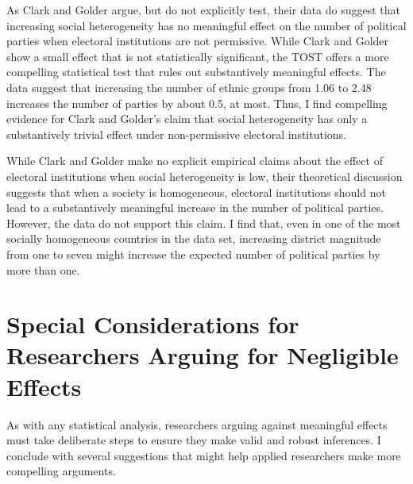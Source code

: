 \documentclass[12pt]{article}
\begin{document}
As Clark and Golder argue, but do not explicitly test, their data do suggest that increasing social heterogeneity has no meaningful effect on the number of political parties when electoral institutions are not permissive. While Clark and Golder show a small effect that is not statistically significant, the TOST offers a more compelling statistical test that rules out substantively meaningful effects. The data suggest that increasing the number of ethnic groups from 1.06 to 2.48 increases the number of parties  by about 0.5, at most. Thus, I find compelling evidence for Clark and Golder's claim that social heterogeneity has only  a substantively trivial effect under non-permissive electoral institutions.

While Clark and Golder make no explicit empirical claims about the effect of electoral institutions when social heterogeneity is low, their theoretical discussion suggests that when a society is homogeneous, electoral institutions should not lead to a substantively meaningful increase in the number of political parties. However, the data do not support this claim. I find that, even in one of the most socially homogeneous countries in the data set,  increasing district magnitude from one to seven might increase the expected number of political parties by more than one.  

\section*{Special Considerations for Researchers Arguing for Negligible Effects}

As with any statistical analysis, researchers arguing against meaningful effects must take deliberate steps to ensure they make valid and robust inferences. I conclude with several suggestions that might help applied researchers make more compelling arguments.
\end{document}
